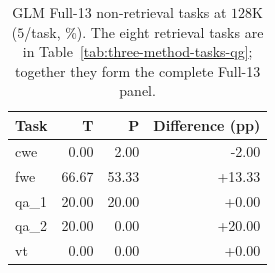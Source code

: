 \begin{table}[ht]
\centering\small
\caption{GLM Full-13 non-retrieval tasks at $128$K ($5$/task, \%). The eight retrieval tasks are in Table~\ref{tab:three-method-tasks-qg}; together they form the complete Full-13 panel.}
\label{tab:glm-full13}
\begin{tabular}{@{}lrrr@{}}
\toprule
Task & T & P & Difference (pp) \\
\midrule
cwe & 0.00 & 2.00 & -2.00 \\
fwe & 66.67 & 53.33 & +13.33 \\
qa\_1 & 20.00 & 20.00 & +0.00 \\
qa\_2 & 20.00 & 0.00 & +20.00 \\
vt & 0.00 & 0.00 & +0.00 \\
\bottomrule
\end{tabular}
\end{table}
